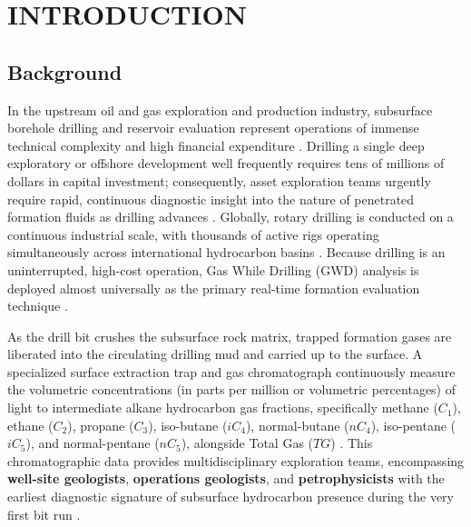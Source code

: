\chapter{INTRODUCTION}

\section{Background}

In the upstream oil and gas exploration and production industry, subsurface borehole drilling and reservoir evaluation represent operations of immense technical complexity and high financial expenditure \citep{ref3, ref9}. Drilling a single deep exploratory or offshore development well frequently requires tens of millions of dollars in capital investment; consequently, asset exploration teams urgently require rapid, continuous diagnostic insight into the nature of penetrated formation fluids as drilling advances \citep{ref3}. Globally, rotary drilling is conducted on a continuous industrial scale, with thousands of active rigs operating simultaneously across international hydrocarbon basins \citep{ref9, ref14, bakerhughes2024}. Because drilling is an uninterrupted, high-cost operation, Gas While Drilling (GWD) analysis is deployed almost universally as the primary real-time formation evaluation technique \citep{ref9, ref12}. 

As the drill bit crushes the subsurface rock matrix, trapped formation gases are liberated into the circulating drilling mud and carried up to the surface. A specialized surface extraction trap and gas chromatograph continuously measure the volumetric concentrations (in parts per million or volumetric percentages) of light to intermediate alkane hydrocarbon gas fractions, specifically methane ($C_1$), ethane ($C_2$), propane ($C_3$), iso-butane ($iC_4$), normal-butane ($nC_4$), iso-pentane ($iC_5$), and normal-pentane ($nC_5$), alongside Total Gas ($TG$) \citep{ref12, haworth1985}. This chromatographic data provides multidisciplinary exploration teams, encompassing \textbf{well-site geologists}, \textbf{operations geologists}, and \textbf{petrophysicists} with the earliest diagnostic signature of subsurface hydrocarbon presence during the very first bit run \citep{ref9, ref12}.

